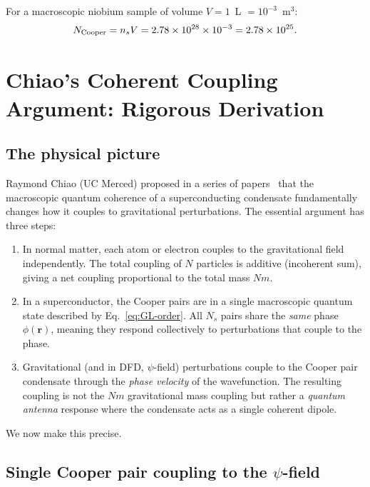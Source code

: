 \documentclass[12pt,aps,prd,twocolumn,superscriptaddress,nofootinbib]{revtex4-2}
\newcommand{\ee}[1]{\times 10^{#1}}
\begin{document}
For a macroscopic niobium sample of volume $V = 1$~L $= 10^{-3}$~m$^3$:
\begin{equation}\label{eq:N-cooper}
N_{\rm Cooper} = n_s V = 2.78\ee{28} \times 10^{-3}
= 2.78\ee{25}.
\end{equation}


\section{Chiao's Coherent Coupling Argument: Rigorous Derivation}
\label{sec:chiao}

\subsection{The physical picture}

Raymond Chiao (UC Merced) proposed in a series of
papers~\cite{Chiao2004,Chiao2007,Chiao2009,Chiao2014} that the
macroscopic quantum coherence of a superconducting condensate
fundamentally changes how it couples to gravitational perturbations.
The essential argument has three steps:

\begin{enumerate}[nosep]
\item In normal matter, each atom or electron couples to the
gravitational field independently. The total coupling of $N$ particles
is additive (incoherent sum), giving a net coupling proportional to
the total mass $Nm$.

\item In a superconductor, the Cooper pairs are in a single macroscopic
quantum state described by Eq.~\eqref{eq:GL-order}. All $N_s$ pairs
share the \emph{same} phase $\phi(\mathbf{r})$, meaning they respond
collectively to perturbations that couple to the phase.

\item Gravitational (and in DFD, $\psi$-field) perturbations couple
to the Cooper pair condensate through the \emph{phase velocity} of
the wavefunction. The resulting coupling is not the $Nm$ gravitational
mass coupling but rather a \emph{quantum antenna} response where the
condensate acts as a single coherent dipole.
\end{enumerate}

We now make this precise.

\subsection{Single Cooper pair coupling to the $\psi$-field}
\end{document}
